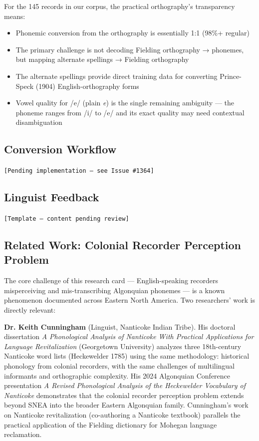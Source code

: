 For the 145 records in our corpus, the practical orthography's transparency
means:
\begin{itemize}
  \item Phonemic conversion from the orthography is essentially 1:1 (98\%+
    regular)
  \item The primary challenge is not decoding Fielding orthography → phonemes,
    but mapping alternate spellings → Fielding orthography
  \item The alternate spellings provide direct training data for converting
    Prince-Speck (1904) English-orthography forms
  \item Vowel quality for /e/ (plain \textit{e}) is the single remaining
    ambiguity --- the phoneme ranges from /i/ to /e/ and its exact quality
    may need contextual disambiguation
\end{itemize}

\subsection{Conversion Workflow}
\texttt{[Pending implementation --- see Issue \#1364]}

\subsection{Linguist Feedback}
\texttt{[Template --- content pending review]}

\subsection{Related Work: Colonial Recorder Perception Problem}

The core challenge of this research card --- English-speaking recorders
misperceiving and mis-transcribing Algonquian phonemes --- is a known
phenomenon documented across Eastern North America. Two researchers' work is
directly relevant:

\textbf{Dr. Keith Cunningham} (Linguist, Nanticoke Indian Tribe). His
doctoral dissertation \emph{A Phonological Analysis of Nanticoke With
Practical Applications for Language Revitalization} (Georgetown University)
analyzes three 18th-century Nanticoke word lists (Heckewelder 1785) using the
same methodology: historical phonology from colonial recorders, with the same
challenges of multilingual informants and orthographic complexity. His 2024
Algonquian Conference presentation \emph{A Revised Phonological Analysis of
the Heckewelder Vocabulary of Nanticoke} demonstrates that the colonial
recorder perception problem extends beyond SNEA into the broader Eastern
Algonquian family. Cunningham's work on Nanticoke revitalization (co-authoring
a Nanticoke textbook) parallels the practical application of the Fielding
dictionary for Mohegan language reclamation.

